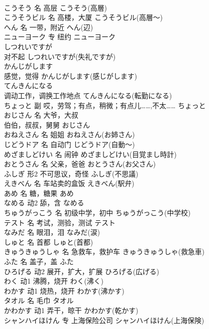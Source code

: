 \documentclass[8pt]{extreport}
\begin{document}
\begin{CJK}{UTF8}{min}
\\	こうそう	名	高层	こうそう(高層)	
\\	こうそうビル	名	高楼，大厦	こうそうビル(高層～)	
\\	へん	名	一带，附近	へん(辺)	
\\	ニューヨーク	专	纽约	ニューヨーク	
\\	しつれいですが	
\\	对不起	しつれいですが(失礼ですが)	
\\	かんじがします	
\\	感觉，觉得	かんじがします(感じがします)	
\\	てんきんになる	
\\	调动工作，调换工作地点	てんきんになる(転勤になる)	
\\	ちょっと	副	哎，劳驾；有点，稍微；有点儿……,不太……	ちょっと	
\\	おじさん	名	大爷，大叔 
\\	伯伯，叔叔，舅舅	おじさん	
\\	おねえさん	名	姐姐	おねえさん(お姉さん)	
\\	じどうドア	名	自动门	じどうドア(自動～)	
\\	めざましどけい	名	闹钟	めざましどけい(目覚まし時計)	
\\	おとうさん	名	父亲，爸爸	おとうさん(お父さん)	
\\	ふしぎ	形2	不可思议，奇怪	ふしぎ(不思議)	
\\	えきべん	名	车站卖的盒饭	えきべん(駅弁)	
\\	あめ	名	糖，糖果	あめ	
\\	なめる	动2	舔，含	なめる	
\\	ちゅうがっこう	名	初级中学，初中	ちゅうがっこう(中学校)	
\\	テスト	名	考试，测验，测试	テスト	
\\	なみだ	名	眼泪，泪	なみだ(涙)	
\\	しゅと	名	首都	しゅと(首都)	
\\	きゅうきゅうしゃ	名	急救车，救护车	きゅうきゅうしゃ(救急車)	
\\	ふた	名	盖子，盖	ふた	
\\	ひろげる	动2	展开，扩大，扩展	ひろげる(広げる)	
\\	わく	动1	沸腾，烧开	わく(沸く)	
\\	わかす	动1	烧热，烧开	わかす(沸かす)	
\\	タオル	名	毛巾	タオル	
\\	かわかす	动1	弄干，晾干	かわかす(乾かす)	
\\	シャンハイほけん	专	上海保险公司	シャンハイほけん(上海保険)	

\end{CJK}
\end{document}
